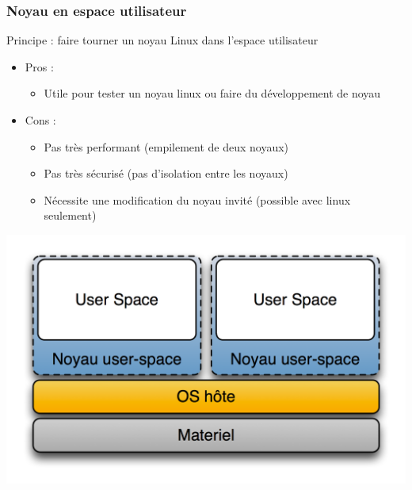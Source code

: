   \begin{frame}
    \frametitle{Noyau en espace utilisateur}
    Principe : faire tourner un noyau Linux dans l'espace utilisateur
    \begin{itemize}
      \item Pros :
      \begin{itemize}
        \item Utile pour tester un noyau linux ou faire du développement de noyau 
      \end{itemize}
      \item Cons :
      \begin{itemize}
        \item Pas très performant (empilement de deux noyaux)
        \item Pas très sécurisé (pas d'isolation entre les noyaux)
        \item Nécessite une modification du noyau invité (possible avec linux seulement)
      \end{itemize}
    \end{itemize}
    \begin{center}
      \includegraphics[width=0.5\linewidth]{images/Diagramme_ArchiKernelUserSpace.png}
    \end{center}
  \end{frame}
  
